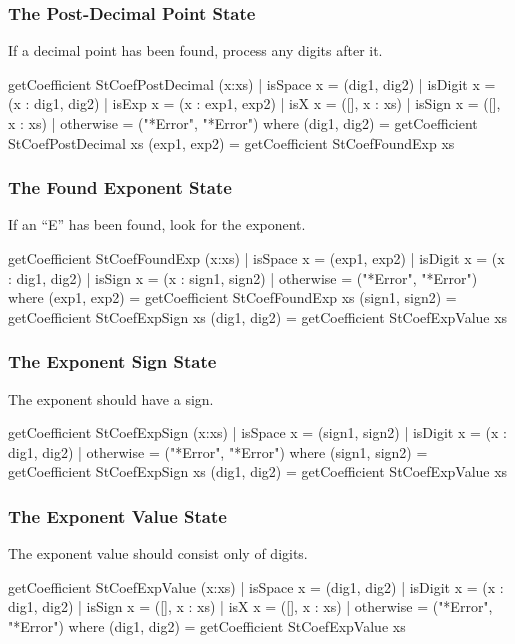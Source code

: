 \subsubsection{The Post-Decimal Point State}
If a decimal point has been found, process any digits after it.
\begin{code}
getCoefficient StCoefPostDecimal (x:xs)
  | isSpace x = (dig1, dig2)
  | isDigit x = (x : dig1, dig2)
  | isExp x   = (x : exp1, exp2)
  | isX x     = ([], x : xs)
  | isSign x  = ([], x : xs)
  | otherwise = ("*Error", "*Error")
    where
      (dig1, dig2) = getCoefficient StCoefPostDecimal xs
      (exp1, exp2) = getCoefficient StCoefFoundExp xs
\end{code}
\subsubsection{The Found Exponent State}
If an ``E'' has been found, look for the exponent.
\begin{code}
getCoefficient StCoefFoundExp (x:xs)
  | isSpace x = (exp1, exp2)
  | isDigit x = (x : dig1, dig2)
  | isSign x  = (x : sign1, sign2)
  | otherwise = ("*Error", "*Error")
    where
      (exp1, exp2) = getCoefficient StCoefFoundExp xs
      (sign1, sign2) = getCoefficient StCoefExpSign xs
      (dig1, dig2) = getCoefficient StCoefExpValue xs
\end{code}
\subsubsection{The Exponent Sign State}
The exponent should have a sign.
\begin{code}
getCoefficient StCoefExpSign (x:xs)
  | isSpace x = (sign1, sign2)
  | isDigit x = (x : dig1, dig2)
  | otherwise = ("*Error", "*Error")
    where
      (sign1, sign2) = getCoefficient StCoefExpSign xs
      (dig1, dig2) = getCoefficient StCoefExpValue xs
\end{code}
\subsubsection{The Exponent Value State}
The exponent value should consist only of digits.
\begin{code}
getCoefficient StCoefExpValue (x:xs)
  | isSpace x = (dig1, dig2)
  | isDigit x = (x : dig1, dig2)
  | isSign x  = ([], x : xs)
  | isX x     = ([], x : xs)
  | otherwise = ("*Error", "*Error")
    where
      (dig1, dig2) = getCoefficient StCoefExpValue xs
\end{code}

